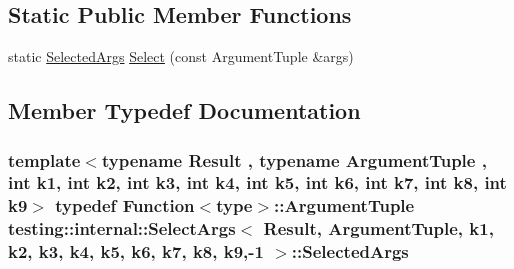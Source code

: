 \subsection*{Static Public Member Functions}
\begin{DoxyCompactItemize}
\item 
static \hyperlink{classtesting_1_1internal_1_1SelectArgs_3_01Result_00_01ArgumentTuple_00_01k1_00_01k2_00_01k3_00_6cec9358efe806d84292a8e378f8b1d2_a620901c52dc62d8ab6ca88625cb63dc5}{Selected\+Args} \hyperlink{classtesting_1_1internal_1_1SelectArgs_3_01Result_00_01ArgumentTuple_00_01k1_00_01k2_00_01k3_00_6cec9358efe806d84292a8e378f8b1d2_abc43659bbcddb9e05c2f947d20a68706}{Select} (const Argument\+Tuple \&args)
\end{DoxyCompactItemize}


\subsection{Member Typedef Documentation}
\subsubsection[{\texorpdfstring{Selected\+Args}{SelectedArgs}}]{\setlength{\rightskip}{0pt plus 5cm}template$<$typename Result , typename Argument\+Tuple , int k1, int k2, int k3, int k4, int k5, int k6, int k7, int k8, int k9$>$ typedef {\bf Function}$<${\bf type}$>$\+::Argument\+Tuple {\bf testing\+::internal\+::\+Select\+Args}$<$ Result, Argument\+Tuple, k1, k2, k3, k4, k5, k6, k7, k8, k9,-\/1 $>$\+::{\bf Selected\+Args}}\hypertarget{classtesting_1_1internal_1_1SelectArgs_3_01Result_00_01ArgumentTuple_00_01k1_00_01k2_00_01k3_00_6cec9358efe806d84292a8e378f8b1d2_a620901c52dc62d8ab6ca88625cb63dc5}{}\label{classtesting_1_1internal_1_1SelectArgs_3_01Result_00_01ArgumentTuple_00_01k1_00_01k2_00_01k3_00_6cec9358efe806d84292a8e378f8b1d2_a620901c52dc62d8ab6ca88625cb63dc5}

